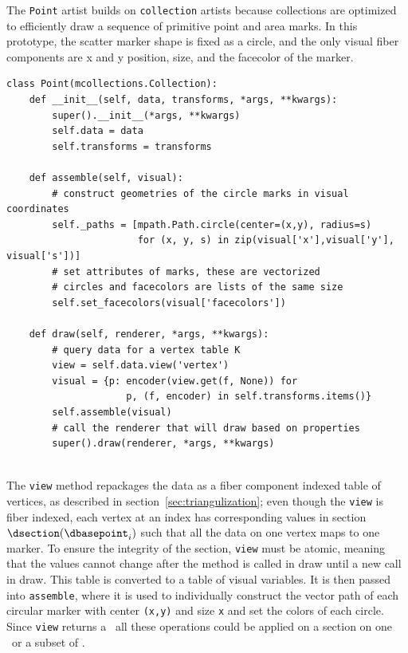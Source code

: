 \documentclass[../main.tex]{subfiles}
\begin{document}
The \texttt{Point} artist builds on \texttt{collection} artists because collections are optimized to efficiently draw a sequence of primitive point and area marks. In this prototype, the scatter marker shape is fixed as a circle, and the only visual fiber components are x and y position, size, and the facecolor of the marker. 
\begin{verbatim}
class Point(mcollections.Collection):
    def __init__(self, data, transforms, *args, **kwargs):
        super().__init__(*args, **kwargs)
        self.data = data
        self.transforms = transforms

    def assemble(self, visual):
        # construct geometries of the circle marks in visual coordinates
        self._paths = [mpath.Path.circle(center=(x,y), radius=s) 
                       for (x, y, s) in zip(visual['x'],visual['y'], visual['s'])] 
        # set attributes of marks, these are vectorized 
        # circles and facecolors are lists of the same size
        self.set_facecolors(visual['facecolors'])
        
    def draw(self, renderer, *args, **kwargs):
        # query data for a vertex table K
        view = self.data.view('vertex') 
        visual = {p: encoder(view.get(f, None)) for 
                     p, (f, encoder) in self.transforms.items()}
        self.assemble(visual)
        # call the renderer that will draw based on properties
        super().draw(renderer, *args, **kwargs)
   
\end{verbatim} 
The \texttt{view} method repackages the data as a fiber component indexed table of vertices, as described in section~\ref{sec:triangulization}; even though the \texttt{view} is fiber indexed, each vertex at an index \dbasepoint has corresponding values in section $\dsection(\dbasepoint_{i})$ such that all the data on one vertex maps to one marker. To ensure the integrity of the section, \texttt{view} must be atomic, meaning that the values cannot change after the method is called in draw until a new call in draw. This table is converted to a table of visual variables. It is then passed into \texttt{assemble}, where it is used to individually construct the vector path of each circular marker with center \texttt{(x,y)} and size \texttt{x} and set the colors of each circle. Since \texttt{view} returns a \dsection\, all these operations could be applied on a section on one \dbasepoint\ or a subset of \dbase.
\end{document}
